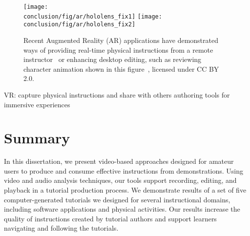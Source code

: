 \begin{figure*}[ht!]
  \centering
  \texttt{[image: \\conclusion/fig/ar/hololens\_fix1]}
  \texttt{[image: \\conclusion/fig/ar/hololens\_fix2]}
\caption{
  Recent Augmented Reality (AR) applications have demonstrated ways of providing real-time physical instructions from a remote instructor~\cite{MicrosoftHoloLensSkype,Gurevich:2012ko} or enhancing desktop editing, such as reviewing character animation shown in this figure~\cite{MotionBuilderAR}, licensed under CC BY 2.0.
}
\end{figure*}

VR: capture physical instructions and share with others
authoring tools for immersive experiences

\section{Summary}
In this dissertation, we present video-based approaches designed for amateur users to produce and consume effective instructions from demonstrations. Using video and audio analysis techniques, our tools support recording, editing, and playback in a tutorial production process. We demonstrate results of a set of five computer-generated tutorials we designed for several instructional domains, including software applications and physical activities. Our results increase the quality of instructions created by tutorial authors and support learners navigating and following the tutorials.
